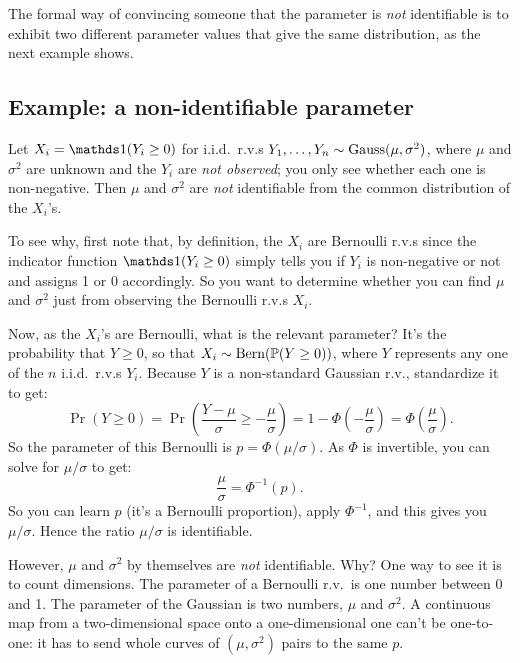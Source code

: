The formal way of convincing someone that the parameter is \textit{not} identifiable is to exhibit two different parameter values that give the same distribution, as the next example shows.

\subsection{Example: a non-identifiable parameter}

\begin{example}
\label{ex:nonidentifiable}
Let $X_i = \ind(Y_i \geq 0)$ for i.i.d.\ r.v.s $Y_1, \ldots, Y_n \sim \text{Gauss}(\mu, \sigma^2)$, where $\mu$ and $\sigma^2$ are unknown and the $Y_i$ are \textit{not observed}; you only see whether each one is non-negative.
Then $\mu$ and $\sigma^2$ are \textit{not} identifiable from the common distribution of the $X_i$'s.
\end{example}

To see why, first note that, by definition, the $X_i$ are Bernoulli r.v.s since the indicator function $\ind(Y_i \geq 0)$ simply tells you if $Y_i$ is non-negative or not and assigns 1 or 0 accordingly.
So you want to determine whether you can find $\mu$ and $\sigma^2$ just from observing the Bernoulli r.v.s $X_i$.

Now, as the $X_i$'s are Bernoulli, what is the relevant parameter?
It's the probability that $Y \geq 0$, so that $X_i \sim \text{Bern}(\mathbb{P}(Y \geq 0))$, where $Y$ represents any one of the $n$ i.i.d.\ r.v.s $Y_i$.
Because $Y$ is a non-standard Gaussian r.v., standardize it to get:
\[
\Pr(Y \geq 0) = \Pr \left( \frac{Y - \mu}{\sigma} \geq -\frac{\mu}{\sigma} \right) = 1 - \Phi \left( -\frac{\mu}{\sigma} \right) = \Phi \left( \frac{\mu}{\sigma} \right).
\]
So the parameter of this Bernoulli is $p = \Phi(\mu/\sigma)$.
As $\Phi$ is invertible, you can solve for $\mu/\sigma$ to get:
\[
\frac{\mu}{\sigma} = \Phi^{-1}(p).
\]
So you can learn $p$ (it's a Bernoulli proportion), apply $\Phi^{-1}$, and this gives you $\mu/\sigma$.
Hence the ratio $\mu/\sigma$ is identifiable.

However, $\mu$ and $\sigma^2$ by themselves are \textit{not} identifiable.
Why?
One way to see it is to count dimensions.
The parameter of a Bernoulli r.v.\ is one number between 0 and 1.
The parameter of the Gaussian is two numbers, $\mu$ and $\sigma^2$.
A continuous map from a two-dimensional space onto a one-dimensional one can't be one-to-one: it has to send whole curves of $(\mu, \sigma^2)$ pairs to the same $p$.

